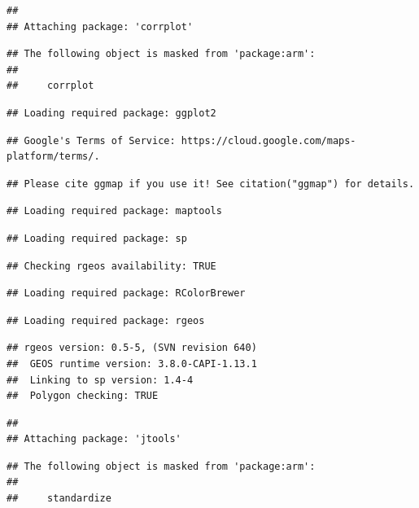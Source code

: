 \documentclass[
]{book}
\begin{document}
\begin{verbatim}
## 
## Attaching package: 'corrplot'
\end{verbatim}

\begin{verbatim}
## The following object is masked from 'package:arm':
## 
##     corrplot
\end{verbatim}

\begin{verbatim}
## Loading required package: ggplot2
\end{verbatim}

\begin{verbatim}
## Google's Terms of Service: https://cloud.google.com/maps-platform/terms/.
\end{verbatim}

\begin{verbatim}
## Please cite ggmap if you use it! See citation("ggmap") for details.
\end{verbatim}

\begin{verbatim}
## Loading required package: maptools
\end{verbatim}

\begin{verbatim}
## Loading required package: sp
\end{verbatim}

\begin{verbatim}
## Checking rgeos availability: TRUE
\end{verbatim}

\begin{verbatim}
## Loading required package: RColorBrewer
\end{verbatim}

\begin{verbatim}
## Loading required package: rgeos
\end{verbatim}

\begin{verbatim}
## rgeos version: 0.5-5, (SVN revision 640)
##  GEOS runtime version: 3.8.0-CAPI-1.13.1 
##  Linking to sp version: 1.4-4 
##  Polygon checking: TRUE
\end{verbatim}

\begin{verbatim}
## 
## Attaching package: 'jtools'
\end{verbatim}

\begin{verbatim}
## The following object is masked from 'package:arm':
## 
##     standardize
\end{verbatim}
\end{document}
